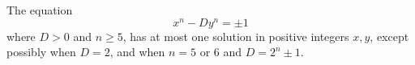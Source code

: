 \begin{proposition}
    The equation
\[
    x^n-Dy^n=\pm1
\]
    where $D>0$ and $n\ge5$, has at most one solution in positive integers $x,y$, except possibly when $D=2$, and when $n=5$ or $6$ and $D=2^n\pm1$.
\end{proposition}
